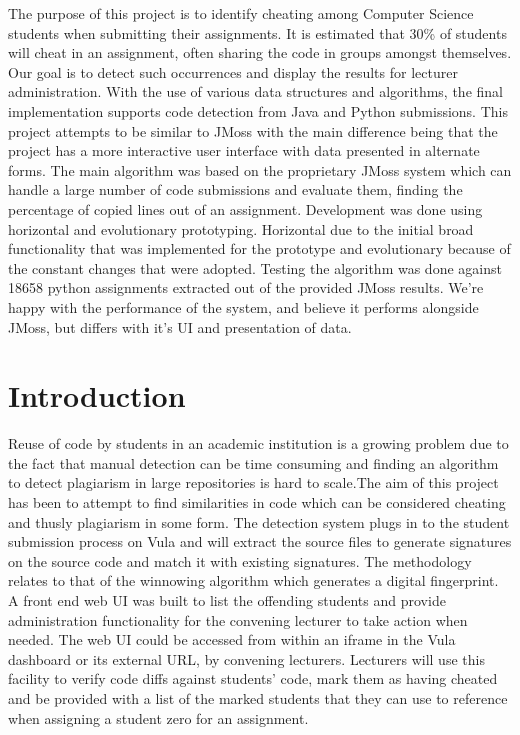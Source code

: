\documentclass[11pt,a4paper]{article}
\begin{document}
The purpose of this project is to identify cheating among Computer Science
students when submitting their assignments. It is estimated that 30\% of
students will cheat in an assignment, often sharing the code in groups amongst
themselves. Our goal is to detect such occurrences and display the results for
lecturer administration. With the use of various data structures and algorithms,
the final implementation supports code detection from Java and Python
submissions. This project attempts to be similar to JMoss with the main
difference being that the project has a more interactive user interface with
data presented in alternate forms. The main algorithm was based on the
proprietary JMoss system which can handle a large number of code submissions and
evaluate them, finding the percentage of copied lines out of an assignment.
Development was done using horizontal and evolutionary prototyping. Horizontal
due to the initial broad functionality that was implemented for the prototype
and evolutionary because of the constant changes that were adopted. Testing the
algorithm was done against 18658 python assignments extracted out of the
provided JMoss results. We're happy with the performance of the system, and
believe it performs alongside JMoss, but differs with it's UI and presentation
of data.

\section{Introduction}
\label{s:introduction}

Reuse of code by students in an academic institution is a growing problem due to
the fact that manual detection can be time consuming and finding an algorithm
to detect plagiarism in large repositories is hard to scale\cite{Burrow}.The aim
of this project has been to attempt to find similarities in code which can be
considered cheating and thusly plagiarism in some form. The detection system
plugs in to the student submission process on Vula and will extract the source
files to generate signatures on the source code and match it with existing
signatures. The methodology relates to that of the winnowing algorithm which
generates a digital fingerprint\cite{frohlich}. A front end web UI was built to list the offending students and provide administration functionality for the convening lecturer to take action when needed. The web UI could be accessed from within an iframe in the Vula dashboard or its external URL, by convening lecturers. Lecturers will use this facility to verify code diffs against students' code, mark them as having cheated and be provided with a list of the marked students that they can use to reference when assigning a student zero for an assignment.
\end{document}

